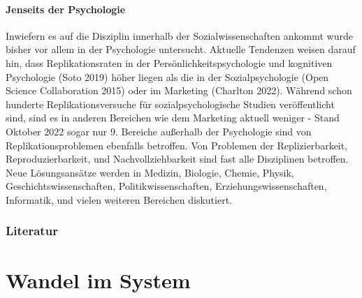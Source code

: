 \documentclass[
  letterpaper,
  DIV=11,
  numbers=noendperiod]{scrreprt}
\begin{document}
\subsubsection{Jenseits der Psychologie}\label{jenseits-der-psychologie}

Inwiefern es auf die Disziplin innerhalb der Sozialwissenschaften
ankommt wurde bisher vor allem in der Psychologie untersucht. Aktuelle
Tendenzen weisen darauf hin, dass Replikationsraten in der
Persönlichkeitspsychologie und kognitiven Psychologie (Soto 2019) höher
liegen als die in der Sozialpsychologie (Open Science Collaboration
2015) oder im Marketing (Charlton 2022). Während schon hunderte
Replikationsversuche für sozialpsychologische Studien veröffentlicht
sind, sind es in anderen Bereichen wie dem Marketing aktuell weniger -
Stand Oktober 2022 sogar nur 9. Bereiche außerhalb der Psychologie sind
von Replikationsproblemen ebenfalls betroffen. Von Problemen der
Replizierbarkeit, Reproduzierbarkeit, und Nachvollziehbarkeit sind fast
alle Disziplinen betroffen. Neue Lösungsansätze werden in Medizin,
Biologie, Chemie, Physik, Geschichtswissenschaften,
Politikwissenschaften, Erziehungswissenschaften, Informatik, und vielen
weiteren Bereichen diskutiert.

\subsection*{Literatur}\label{literatur-5}

\chapter{Wandel im System}\label{wandel-im-system}
\end{document}
